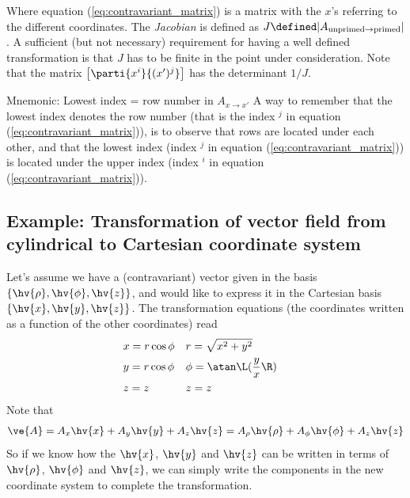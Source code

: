\documentclass[a4paper, 12pt]{article}
\begin{document}
%
Where equation (\ref{eq:contravariant_matrix}) is a matrix with the $x$'s 
referring to the different coordinates. The \emph{Jacobian} is 
defined as $J\defined|A_{\text{unprimed}\to \text{primed}}|$. A sufficient 
(but not necessary) requirement for having a well defined transformation is 
that $J$ has to be finite in the point under consideration. Note that the matrix
%
$\begin{bmatrix}
 \parti{x^i}{(x')^j}
\end{bmatrix}$
has the determinant $1/J$.

\vspace{0.5cm}
\begin{greenbox}{Mnemonic: Lowest index = row number in $A_{x \to x'}$}
A way to remember that the lowest index denotes the row 
number (that is the index $^j$ in equation (\ref{eq:contravariant_matrix})), is 
to observe that rows are located under each other, and that the lowest index 
(index $^j$ in equation (\ref{eq:contravariant_matrix})) is 
located under the upper index (index $^i$ in equation 
(\ref{eq:contravariant_matrix})). 
\end{greenbox}

\subsection{Example: Transformation of vector field from cylindrical to 
Cartesian coordinate system}
Let's assume we have a (contravariant) vector given in the basis $\{\hv{\rho}, 
\hv{\phi}, \hv{z}\}$, and would like to express it in the Cartesian basis 
$\{\hv{x}, \hv{y}, \hv{z}\}$. The transformation equations (the coordinates 
written as a function of the other coordinates) read
%
\begin{align*}
 &x = r \cos\phi&
 &r = \sqrt{x^2+y^2}&
 \\
 &y = r \cos\phi&
 &\phi = \atan\L(\frac{y}{x}\R)&
 \\
 &z=z&
 &z=z&
\end{align*}
%
Note that
%
\begin{align}
 \ve{A} =
 A_x \hv{x} + A_y \hv{y} + A_z \hv{z} =
 A_\rho \hv{\rho} + A_\phi \hv{\phi} + A_z  \hv{z}
 \label{eq:component}
\end{align}
%
So if we know how the $\hv{x}$, $\hv{y}$ and $\hv{z}$ can be written in terms 
of $\hv{\rho}$, $\hv{\phi}$ and $\hv{z}$, we can simply write the components 
in the new coordinate system to complete the transformation.
\end{document}
